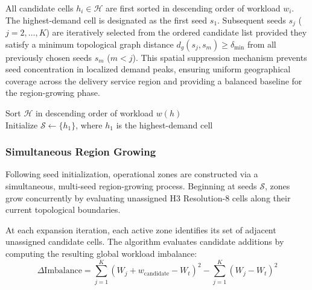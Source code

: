 \documentclass{article}
\begin{document}
All candidate cells $h_i \in \mathcal{H}$ are first sorted in descending order of workload $w_i$. The highest-demand cell is designated as the first seed $s_1$. Subsequent seeds $s_j$ ($j = 2, \dots, K$) are iteratively selected from the ordered candidate list provided they satisfy a minimum topological graph distance $d_g(s_j, s_m) \ge \delta_{\min}$ from all previously chosen seeds $s_m$ ($m < j$). This spatial suppression mechanism prevents seed concentration in localized demand peaks, ensuring uniform geographical coverage across the delivery service region and providing a balanced baseline for the region-growing phase.

\begin{algorithm}[htbp]


\BlankLine
Sort $\mathcal{H}$ in descending order of workload $w(h)$\;\\
Initialize $\mathcal{S} \leftarrow \{h_1\}$, where $h_1$ is the highest-demand cell\;


\;
\caption{AHSI Seed Initialization}
\label{alg:ahsi_seed_initialization}
\end{algorithm}

\subsubsection{Simultaneous Region Growing}
\label{subsubsec:ahsi_simultaneous_region_growing}

Following seed initialization, operational zones are constructed via a simultaneous, multi-seed region-growing process. Beginning at seeds $\mathcal{S}$, zones grow concurrently by evaluating unassigned H3 Resolution-8 cells along their current topological boundaries.

At each expansion iteration, each active zone identifies its set of adjacent unassigned candidate cells. The algorithm evaluates candidate additions by computing the resulting global workload imbalance:
$$
\Delta \text{Imbalance} = \sum_{j=1}^{K} (W_j + w_{\text{candidate}} - W_t)^2 - \sum_{j=1}^{K} (W_j - W_t)^2
$$
\end{document}
